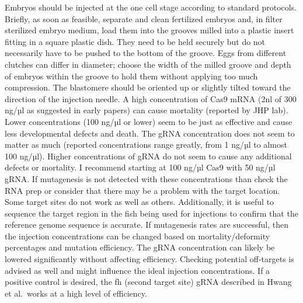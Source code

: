 \documentclass[
  letterpaper,
  DIV=11,
  numbers=noendperiod]{scrreprt}
\begin{document}
\begin{tcolorbox}[enhanced jigsaw, rightrule=.15mm, title=\textcolor{quarto-callout-note-color}{\faInfo}\hspace{0.5em}{Notes}, titlerule=0mm, opacitybacktitle=0.6, toprule=.15mm, bottomrule=.15mm, opacityback=0, left=2mm, colframe=quarto-callout-note-color-frame, breakable, coltitle=black, colback=white, colbacktitle=quarto-callout-note-color!10!white, bottomtitle=1mm, leftrule=.75mm, toptitle=1mm, arc=.35mm]

Embryos should be injected at the one cell stage according to standard
protocols. Briefly, as soon as feasible, separate and clean fertilized
embryos and, in filter sterilized embryo medium, load them into the
grooves milled into a plastic insert fitting in a square plastic dish.
They need to be held securely but do not necessarily have to be pushed
to the bottom of the groove. Eggs from different clutches can differ in
diameter; choose the width of the milled groove and depth of embryos
within the groove to hold them without applying too much compression.
The blastomere should be oriented up or slightly tilted toward the
direction of the injection needle. A high concentration of Cas9 mRNA
(2nl of 300 ng/µl as suggested in early papers) can cause mortality
(reported by JHP lab). Lower concentrations (100 ng/µl or lower) seem to
be just as effective and cause less developmental defects and death. The
gRNA concentration does not seem to matter as much (reported
concentrations range greatly, from 1 ng/µl to almost 100 ng/µl). Higher
concentrations of gRNA do not seem to cause any additional defects or
mortality. I recommend starting at 100 ng/µl Cas9 with 50 ng/µl gRNA. If
mutagenesis is not detected with these concentrations than check the RNA
prep or consider that there may be a problem with the target location.
Some target sites do not work as well as others. Additionally, it is
useful to sequence the target region in the fish being used for
injections to confirm that the reference genome sequence is accurate. If
mutagenesis rates are successful, then the injection concentrations can
be changed based on mortality/deformity percentages and mutation
efficiency. The gRNA concentration can likely be lowered significantly
without affecting efficiency. Checking potential off-targets is advised
as well and might influence the ideal injection concentrations. If a
positive control is desired, the fh (second target site) gRNA described
in Hwang et al.~works at a high level of efficiency.

\end{tcolorbox}
\end{document}
